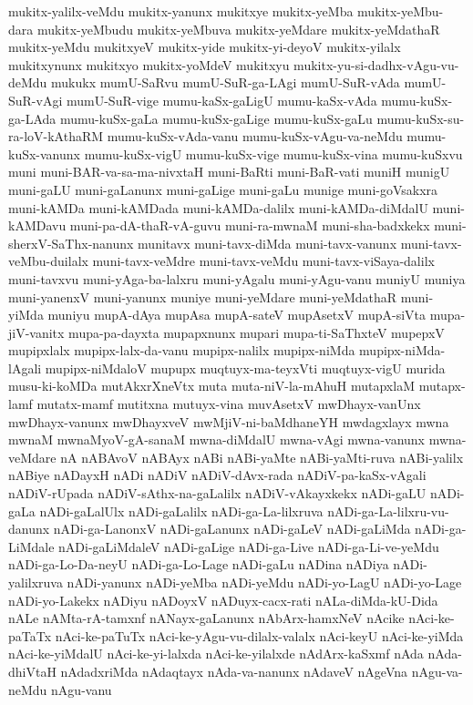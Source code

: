 {mukitx-yalilx-veMdu
mukitx-yanunx
mukitxye
mukitx-yeMba
mukitx-yeMbu-dara
mukitx-yeMbudu
mukitx-yeMbuva
mukitx-yeMdare
mukitx-yeMdathaR
mukitx-yeMdu
mukitxyeV
mukitx-yide
mukitx-yi-deyoV
mukitx-yilalx
mukitxynunx
mukitxyo
mukitx-yoMdeV
mukitxyu
mukitx-yu-si-dadhx-vAgu-vu-deMdu
mukukx
mumU-SaRvu
mumU-SuR-ga-LAgi
mumU-SuR-vAda
mumU-SuR-vAgi
mumU-SuR-vige
mumu-kaSx-gaLigU
mumu-kaSx-vAda
mumu-kuSx-ga-LAda
mumu-kuSx-gaLa
mumu-kuSx-gaLige
mumu-kuSx-gaLu
mumu-kuSx-su-ra-loV-kAthaRM
mumu-kuSx-vAda-vanu
mumu-kuSx-vAgu-va-neMdu
mumu-kuSx-vanunx
mumu-kuSx-vigU
mumu-kuSx-vige
mumu-kuSx-vina
mumu-kuSxvu
muni
muni-BAR-va-sa-ma-nivxtaH
muni-BaRti
muni-BaR-vati
muniH
munigU
muni-gaLU
muni-gaLanunx
muni-gaLige
muni-gaLu
munige
muni-goVsakxra
muni-kAMDa
muni-kAMDada
muni-kAMDa-dalilx
muni-kAMDa-diMdalU
muni-kAMDavu
muni-pa-dA-thaR-vA-guvu
muni-ra-mwnaM
muni-sha-badxkekx
muni-sherxV-SaThx-nanunx
munitavx
muni-tavx-diMda
muni-tavx-vanunx
muni-tavx-veMbu-duilalx
muni-tavx-veMdre
muni-tavx-veMdu
muni-tavx-viSaya-dalilx
muni-tavxvu
muni-yAga-ba-lalxru
muni-yAgalu
muni-yAgu-vanu
muniyU
muniya
muni-yanenxV
muni-yanunx
muniye
muni-yeMdare
muni-yeMdathaR
muni-yiMda
muniyu
mupA-dAya
mupAsa
mupA-sateV
mupAsetxV
mupA-siVta
mupa-jiV-vanitx
mupa-pa-dayxta
mupapxnunx
mupari
mupa-ti-SaThxteV
mupepxV
mupipxlalx
mupipx-lalx-da-vanu
mupipx-nalilx
mupipx-niMda
mupipx-niMda-lAgali
mupipx-niMdaloV
mupupx
muqtuyx-ma-teyxVti
muqtuyx-vigU
murida
musu-ki-koMDa
mutAkxrXneVtx
muta
muta-niV-la-mAhuH
mutapxlaM
mutapx-lamf
mutatx-mamf
mutitxna
mutuyx-vina
muvAsetxV
mwDhayx-vanUnx
mwDhayx-vanunx
mwDhayxveV
mwMjiV-ni-baMdhaneYH
mwdagxlayx
mwna
mwnaM
mwnaMyoV-gA-sanaM
mwna-diMdalU
mwna-vAgi
mwna-vanunx
mwna-veMdare
nA
nABAvoV
nABAyx
nABi
nABi-yaMte
nABi-yaMti-ruva
nABi-yalilx
nABiye
nADayxH
nADi
nADiV
nADiV-dAvx-rada
nADiV-pa-kaSx-vAgali
nADiV-rUpada
nADiV-sAthx-na-gaLalilx
nADiV-vAkayxkekx
nADi-gaLU
nADi-gaLa
nADi-gaLalUlx
nADi-gaLalilx
nADi-ga-La-lilxruva
nADi-ga-La-lilxru-vu-danunx
nADi-ga-LanonxV
nADi-gaLanunx
nADi-gaLeV
nADi-gaLiMda
nADi-ga-LiMdale
nADi-gaLiMdaleV
nADi-gaLige
nADi-ga-Live
nADi-ga-Li-ve-yeMdu
nADi-ga-Lo-Da-neyU
nADi-ga-Lo-Lage
nADi-gaLu
nADina
nADiya
nADi-yalilxruva
nADi-yanunx
nADi-yeMba
nADi-yeMdu
nADi-yo-LagU
nADi-yo-Lage
nADi-yo-Lakekx
nADiyu
nADoyxV
nADuyx-cacx-rati
nALa-diMda-kU-Dida
nALe
nAMta-rA-tamxnf
nANayx-gaLanunx
nAbArx-hamxNeV
nAcike
nAci-ke-paTaTx
nAci-ke-paTuTx
nAci-ke-yAgu-vu-dilalx-valalx
nAci-keyU
nAci-ke-yiMda
nAci-ke-yiMdalU
nAci-ke-yi-lalxda
nAci-ke-yilalxde
nAdArx-kaSxmf
nAda
nAda-dhiVtaH
nAdadxriMda
nAdaqtayx
nAda-va-nanunx
nAdaveV
nAgeVna
nAgu-va-neMdu
nAgu-vanu
}
